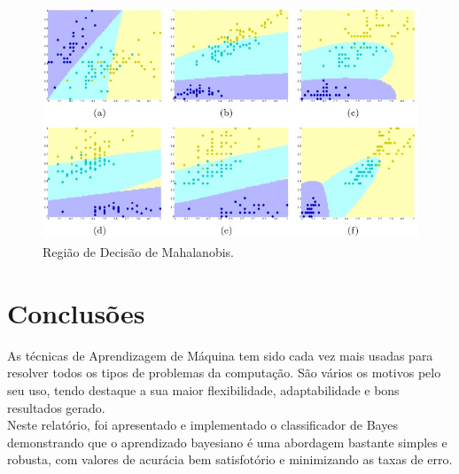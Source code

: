 \documentclass[a4paper]{article}
\begin{document}
\begin{figure}[H]
\centering

\includegraphics[height=7cm]{Imagens/decisionboundary_type4.jpg}

\caption{Região de Decisão de Mahalanobis.}
\label{fig:Figura13}
\end{figure}


\section{Conclusões}

As técnicas de Aprendizagem de Máquina tem sido cada vez mais usadas para resolver todos os tipos de problemas da computação. São vários os motivos pelo seu uso, tendo destaque a sua maior flexibilidade, adaptabilidade e bons resultados gerado. \\

Neste relatório, foi apresentado e implementado o classificador de Bayes demonstrando que o aprendizado bayesiano é uma abordagem bastante simples e robusta, com valores de acurácia bem satisfotório e minimizando as taxas de erro. 
\end{document}
